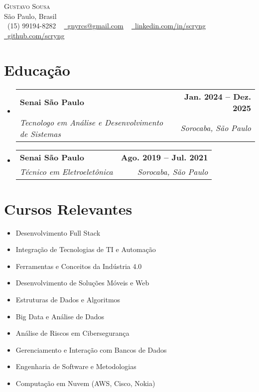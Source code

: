\documentclass[letterpaper,11pt]{article}
\makeatletter
\newcommand{\resumeSubheading}[4]{
  \vspace{-2pt}\item
    \begin{tabular*}{1.0\textwidth}[t]{l@{\extracolsep{\fill}}r}
      \textbf{#1} & \textbf{\small #2} \\
      \textit{\small#3} & \textit{\small #4} \\
    \end{tabular*}\vspace{-7pt}
}
\newcommand{\resumeSubHeadingListStart}{\begin{itemize}[leftmargin=0.0in, label={}]}
\newcommand{\resumeSubHeadingListEnd}{\end{itemize}}
\makeatother
\begin{document}
\begin{center}
    {\Huge \scshape Gustavo Sousa} \\ \vspace{1pt}
    São Paulo, Brasil \\ \vspace{1pt}
    \small \raisebox{-0.1\height}\faPhone\ (15) 99194-8282 ~ 
    \href{mailto:gnyrcs@gmail.com}{\raisebox{-0.2\height}\faEnvelope\  \underline{gnyrcs@gmail.com}} ~ 
    \href{https://linkedin.com/in/scryng}{\raisebox{-0.2\height}\faLinkedin\ \underline{linkedin.com/in/scryng}}  ~
    \href{https://github.com/scryng}{\raisebox{-0.2\height}\faGithub\ \underline{github.com/scryng}}
    \vspace{-8pt}
\end{center}

\section{Educação}
  \resumeSubHeadingListStart
    \resumeSubheading
      {Senai São Paulo}{Jan. 2024 -- Dez. 2025}
      {Tecnologo em Análise e Desenvolvimento de Sistemas}{Sorocaba, São Paulo}
    \resumeSubheading
      {Senai São Paulo}{Ago. 2019 -- Jul. 2021}
      {Técnico em Eletroeletônica}{Sorocaba, São Paulo}
  \resumeSubHeadingListEnd

\section{Cursos Relevantes}
    \begin{multicols}{2}
        \begin{itemize}[itemsep=-5pt, parsep=3pt]
            \item\small Desenvolvimento Full Stack
            \item Integração de Tecnologias de TI e Automação
            \item Ferramentas e Conceitos da Indústria 4.0
            \item Desenvolvimento de Soluções Móveis e Web
            \item Estruturas de Dados e Algoritmos
            \item Big Data e Análise de Dados
            \item Análise de Riscos em Cibersegurança
            \item Gerenciamento e Interação com Bancos de Dados
            \item Engenharia de Software e Metodologias
            \item Computação em Nuvem (AWS, Cisco, Nokia)
        \end{itemize}
    \end{multicols}
    \vspace*{2.0\multicolsep}
\end{document}
